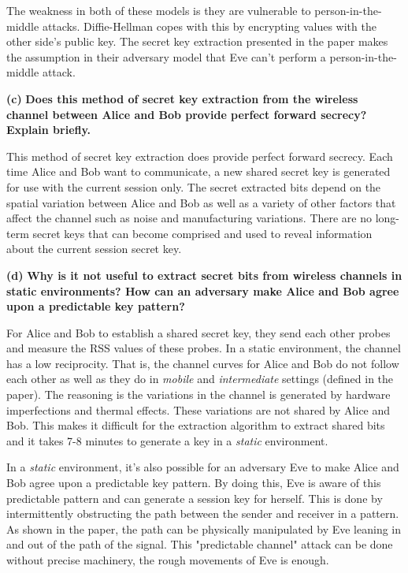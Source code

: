 \documentclass[11pt]{article}
\renewcommand\part[1]{\vspace{.10in}\textbf{(#1)}}
\begin{document}
The weakness in both of these models is they are vulnerable to person-in-the-middle attacks. Diffie-Hellman copes with this by encrypting values with the other side's public key. The secret key extraction presented in the paper makes the assumption in their adversary model that Eve can't perform a person-in-the-middle attack.

\part{c} \textbf{Does this method of secret key extraction from the wireless channel between Alice and Bob provide perfect forward secrecy? Explain briefly.}

This method of secret key extraction does provide perfect forward secrecy. Each time Alice and Bob want to communicate, a new shared secret key is generated for use with the current session only. The secret extracted bits depend on the spatial variation between Alice and Bob as well as a variety of other factors that affect the channel such as noise and manufacturing variations. There are no long-term secret keys that can become comprised and used to reveal information about the current session secret key.


\part{d} \textbf{Why is it not useful to extract secret bits from wireless channels in static environments? How can an adversary make Alice and Bob agree upon a predictable key pattern?}

For Alice and Bob to establish a shared secret key, they send each other probes and measure the RSS values of these probes. In a static environment, the channel has a low reciprocity. That is, the channel curves for Alice and Bob do not follow each other as well as they do in \textit{mobile} and \textit{intermediate} settings (defined in the paper). The reasoning is the variations in the channel is generated by hardware imperfections and thermal effects. These variations are not shared by Alice and Bob. This makes it difficult for the extraction algorithm to extract shared bits and it takes 7-8 minutes to generate a key in a \textit{static} environment.

In a \textit{static} environment, it's also possible for an adversary Eve to make Alice and Bob agree upon a predictable key pattern. By doing this, Eve is aware of this predictable pattern and can generate a session key for herself. This is done by intermittently obstructing the path between the sender and receiver in a pattern. As shown in the paper, the path can be physically manipulated by Eve leaning in and out of the path of the signal. This "predictable channel" attack can be done without precise machinery, the rough movements of Eve is enough.
\end{document}
